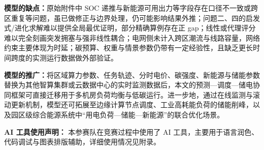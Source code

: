 \documentclass[UTF8,a4paper,zihao=-4]{ctexart}
\begin{document}
\textbf{模型的缺点：}原始附件中 SOC 递推与新能源可用出力等字段存在口径不一致或跨区重复等问题，虽已做修正与边界处理，仍可能影响结果外推；问题二、四的启发式/进化求解难以提供全局最优证明，部分精确算例存在正 gap；线性或代理评分难以完全刻画突发拥塞与强非线性耦合；电网侧未计入跨区潮流与线路容量，网络约束主要体现为时延；碳预算、权重与情景参数仍带有一定经验性，且缺乏更长时间跨度的实测运行数据做外部验证。

\textbf{模型的推广：}将区域算力参数、任务轨迹、分时电价、碳强度、新能源与储能参数替换为其他智算集群或云数据中心的实时监测数据后，本文的预测—调度—储电协同框架可直接迁移用于多机房负荷均衡与低碳运行。进一步地，通过在线监测与滚动更新机制，模型还可拓展至边缘计算节点调度、工业高耗能负荷的储能削峰，以及园区级综合能源系统中“用电负荷—储能—新能源”的联合优化场景。
\newpage
{}


\vspace{1em}

\noindent\textbf{AI 工具使用声明：}
本参赛队在竞赛过程中使用了 AI 工具，主要用于语言润色、代码调试与图表排版辅助，详细使用情况见附录。
\end{document}
